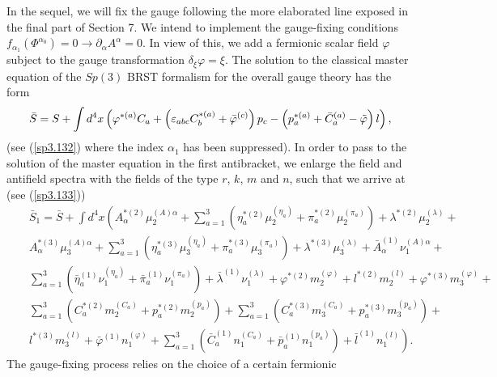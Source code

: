 \documentclass[a4paper,12pt]{article}
\begin{document}
In the sequel, we will fix the gauge following the more elaborated line
exposed in the final part of Section 7. We intend to implement the
gauge-fixing conditions $f_{\alpha _{1}}\left( \Phi ^{\alpha _{0}}\right)
=0\rightarrow \partial _{\alpha }A^{\alpha }=0$. In view of this, we add a
fermionic scalar field $\varphi $ subject to the gauge transformation $%
\delta _{\xi }\varphi =\xi $. The solution to the classical master equation
of the $Sp(3)$ BRST formalism for the overall gauge theory has the form 
\begin{equation}
\bar{S}=S+\int d^{4}x\left( \varphi ^{*(a)}C_{a}+\left( \varepsilon
_{abc}C_{b}^{*(a)}+\bar{\varphi}^{(c)}\right) p_{c}-\left( p_{a}^{*(a)}+\bar{%
C}_{a}^{(a)}-\tilde{\varphi}\right) l\right) ,  \label{sp3.e52a}
\end{equation}
(see (\ref{sp3.132}) where the index $\alpha _{1}$ has been suppressed). In
order to pass to the solution of the master equation in the first
antibracket, we enlarge the field and antifield spectra with the fields of
the type $r$, $k$, $m$ and $n$, such that we arrive at (see (\ref{sp3.133})) 
\begin{eqnarray}
&&\bar{S}_{1}=\bar{S}+\int d^{4}x\left( A_{\alpha }^{*(2)}\mu
_{2}^{(A)\alpha }+\sum\limits_{a=1}^{3}\left( \eta _{a}^{*(2)}\mu
_{2}^{(\eta _{a})}+\pi _{a}^{*(2)}\mu _{2}^{(\pi _{a})}\right) +\lambda
^{*(2)}\mu _{2}^{(\lambda )}+\right.  \nonumber \\
&&A_{\alpha }^{*(3)}\mu _{3}^{(A)\alpha }+\sum\limits_{a=1}^{3}\left( \eta
_{a}^{*(3)}\mu _{3}^{(\eta _{a})}+\pi _{a}^{*(3)}\mu _{3}^{(\pi
_{a})}\right) +\lambda ^{*(3)}\mu _{3}^{(\lambda )}+\bar{A}_{\alpha
}^{(1)}\nu _{1}^{(A)\alpha }+  \nonumber \\
&&\sum\limits_{a=1}^{3}\left( \bar{\eta}_{a}^{(1)}\nu _{1}^{(\eta _{a})}+%
\bar{\pi}_{a}^{(1)}\nu _{1}^{(\pi _{a})}\right) +\bar{\lambda}^{(1)}\nu
_{1}^{(\lambda )}+\varphi ^{*(2)}m_{2}^{(\varphi
)}+l^{*(2)}m_{2}^{(l)}+\varphi ^{*(3)}m_{3}^{(\varphi )}+  \nonumber \\
&&\sum\limits_{a=1}^{3}\left(
C_{a}^{*(2)}m_{2}^{(C_{a})}+p_{a}^{*(2)}m_{2}^{(p_{a})}\right)
+\sum\limits_{a=1}^{3}\left(
C_{a}^{*(3)}m_{3}^{(C_{a})}+p_{a}^{*(3)}m_{3}^{(p_{a})}\right) +  \nonumber
\\
&&\left. l^{*(3)}m_{3}^{(l)}+\bar{\varphi}^{(1)}n_{1}^{(\varphi
)}+\sum\limits_{a=1}^{3}\left( \bar{C}_{a}^{(1)}n_{1}^{(C_{a})}+\bar{p}%
_{a}^{(1)}n_{1}^{(p_{a})}\right) +\bar{l}^{(1)}n_{1}^{(l)}\right) .
\label{sp3.e59}
\end{eqnarray}
The gauge-fixing process relies on the choice of a certain fermionic
\end{document}
